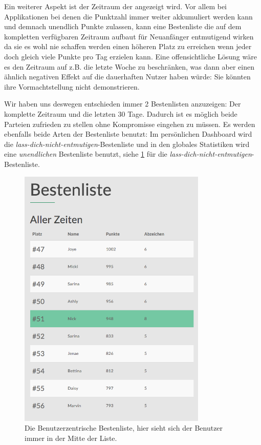 \documentclass[12pt,twoside]{book}
\begin{document}
Ein weiterer Aspekt ist der Zeitraum der angezeigt wird. Vor allem bei Applikationen bei denen die Punktzahl immer weiter akkumuliert werden kann und demnach unendlich Punkte zulassen, kann eine Bestenliste die auf dem kompletten verfügbaren Zeitraum aufbaut für Neuanfänger entmutigend wirken da sie es wohl nie schaffen werden einen höheren Platz zu erreichen wenn jeder doch gleich viele Punkte pro Tag erzielen kann.
Eine offensichtliche Lösung wäre es den Zeitraum auf z.B. die letzte Woche zu beschränken, was dann aber einen ähnlich negativen Effekt auf die dauerhaften Nutzer haben würde: Sie könnten ihre Vormachtstellung nicht demonstrieren.

Wir haben uns deswegen entschieden immer 2 Bestenlisten anzuzeigen: Der komplette Zeitraum und die letzten 30 Tage. Dadurch ist es möglich beide Parteien zufrieden zu stellen ohne Kompromisse eingehen zu müssen. Es werden ebenfalls beide Arten der Bestenliste benutzt: Im persönlichen Dashboard wird die \textit{lass-dich-nicht-entmutigen}-Bestenliste und in den globales Statistiken wird eine \textit{unendlichen} Bestenliste benutzt, siehe \ref{fig:leaderboarduser} für die \textit{lass-dich-nicht-entmutigen}-Bestenliste.

\begin{figure}[h]
    \centering
    \includegraphics[width=0.8\textwidth]{images/infoboard_leaderboard_user.png}
    \caption{Die Benutzerzentrische Bestenliste, hier sieht sich der Benutzer immer in der Mitte der Liste.}
    \label{fig:leaderboarduser}
\end{figure}
\end{document}
